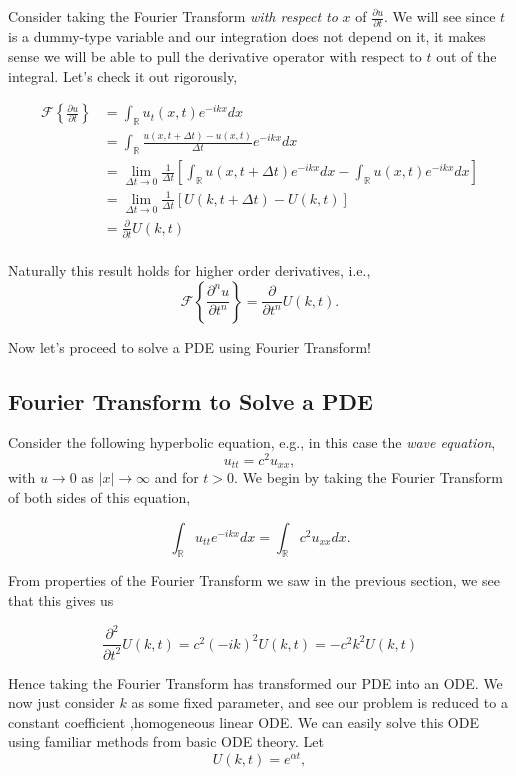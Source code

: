 \begin{enumerate}
Consider taking the Fourier Transform \emph{with respect to} $x$ of $\frac{\partial u}{\partial t}.$ We will see since $t$ is a dummy-type variable and our integration does not depend on it, it makes sense we will be able to pull the derivative operator with respect to $t$ out of the integral. Let's check it out rigorously,

\begin{align*}
\mathscr{F}\left\{ \frac{\partial u}{\partial t} \right\} &= \int_{\mathbb{R}} u_t(x,t) e^{-ikx} dx \\
&= \int_{\mathbb{R}} \frac{ u(x,t+\Delta t) - u(x,t) }{\Delta t} e^{-ikx} dx \\
&= \lim_{\Delta t\rightarrow 0} \frac{1}{\Delta t} \left[ \int_{\mathbb{R}} u(x,t+\Delta t) e^{-ikx} dx - \int_{\mathbb{R}} u(x,t) e^{-ikx} dx  \right] \\
&= \lim_{\Delta t\rightarrow 0} \frac{1}{\Delta t} \left[ U(k,t+\Delta t) - U(k,t) \right] \\
&= \frac{\partial}{\partial t} U(k,t)\\
\end{align*}

Naturally this result holds for higher order derivatives, i.e.,
$$\mathscr{F}\left\{\frac{\partial^n u}{\partial t^n}  \right\} = \frac{\partial}{\partial t^n} U(k,t).$$
\end{enumerate}

Now let's proceed to solve a PDE using Fourier Transform! 


%
%
\subsection{Fourier Transform to Solve a PDE}

Consider the following hyperbolic equation, e.g., in this case the \emph{wave equation},
$$u_{tt} = c^2 u_{xx},$$ with $u\rightarrow0$ as $|x|\rightarrow \infty$ and for $t>0$. We begin by taking the Fourier Transform of both sides of this equation, 

$$\int_{\mathbb{R}} u_{tt} e^{-ikx} dx = \int_{\mathbb{R}} c^2 u_{xx} dx.$$

From properties of the Fourier Transform we saw in the previous section, we see that this gives us 

$$\frac{\partial^2 }{\partial t^2} U(k,t) = c^2 (-ik)^2 U(k,t) = -c^2k^2 U(k,t)$$

Hence taking the Fourier Transform has transformed our PDE into an ODE. We now just consider $k$ as some fixed parameter, and see our problem is reduced to a constant coefficient ,homogeneous linear ODE. We can easily solve this ODE using familiar methods from basic ODE theory. Let $$U(k,t) = e^{\alpha t},$$


